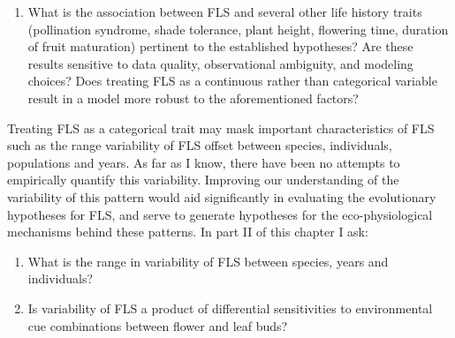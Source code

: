 \documentclass[12pt]{article}\usepackage[]{graphicx}\usepackage[]{color}
\begin{document}
\begin{enumerate}
\item  What is the association between FLS and several other life history traits (pollination syndrome, shade tolerance, plant height, flowering time, duration of fruit maturation) pertinent to the established hypotheses? Are these results sensitive to data quality, observational ambiguity, and modeling choices? Does treating FLS as a continuous rather than categorical variable result in a model more robust to the aforementioned factors?
\end{enumerate}
\indent\indent Treating FLS as a categorical trait may mask important characteristics of FLS such as the range variability of FLS offset between species, individuals, populations and years. As far as I know, there have been no attempts to empirically quantify this variability. Improving our understanding of the variability of this pattern would aid significantly in evaluating the evolutionary hypotheses for FLS, and serve to generate hypotheses for the eco-physiological mechanisms behind these patterns. In part II of this chapter I ask:
\begin{enumerate}
\item What is the range in variability of FLS between species, years and individuals?
\item Is variability of FLS a product of differential sensitivities to environmental cue combinations between flower and leaf buds?
\end{enumerate}
\end{document}
